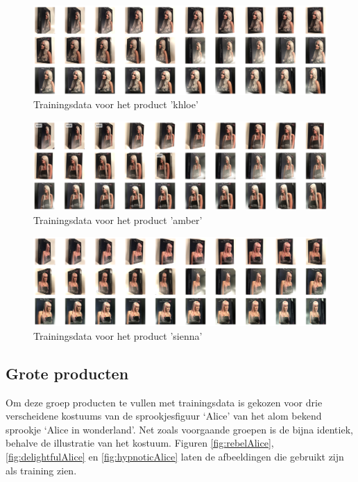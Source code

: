 \begin{figure}[h!]
    \centering
        \includegraphics[width=1\textwidth]{img/khloe.png}
    \caption{Trainingsdata voor het product 'khloe'}
    \label{fig:khloe}
  \end{figure}

  \begin{figure}[h!]
    \centering
        \includegraphics[width=1\textwidth]{img/amber.png}
    \caption{Trainingsdata voor het product 'amber'}
    \label{fig:amber}
  \end{figure}

  \begin{figure}[h!]
    \centering
        \includegraphics[width=1\textwidth]{img/sienna.png}
    \caption{Trainingsdata voor het product 'sienna'}
    \label{fig:sienna}
  \end{figure}

  \subsection{Grote producten}
  \label{ssec:Grote producten}

  Om deze groep producten te vullen met trainingsdata is gekozen voor drie verscheidene kostuums van de sprookjesfiguur ‘Alice’ van het alom bekend sprookje ‘Alice in wonderland’. Net zoals voorgaande groepen is de bijna identiek, behalve de illustratie van het kostuum. 
  Figuren \ref{fig:rebelAlice}, \ref{fig:delightfulAlice} en \ref{fig:hypnoticAlice} laten de afbeeldingen die gebruikt zijn als training zien.
  
